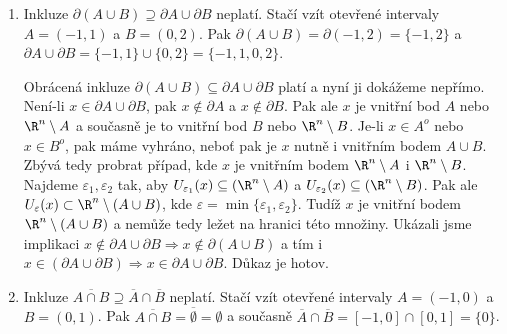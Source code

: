 \documentclass[answers]{exam}
\begin{document}
\begin{questions}
\begin{solution}
\begin{enumerate}[label=(\roman*)]
				Zkusme nyn\'i $\supseteq$. Je-li $x\in\partial\overline A$ a $\varepsilon>0$, pak $U_\varepsilon(x)\cap\overline A\ne\emptyset$ a $U_\varepsilon(x)\cap(\R^n\setminus\overline A)\ne\emptyset$. Jeliko\v z $(\R^n\setminus{\overline A})\subseteq (\R^n\setminus A)$, pak i $U_\varepsilon(x)\cap (\R^n\setminus A)\ne\emptyset$. Zvolme $x'\in U_\varepsilon(x)\cap\overline A$. Pak $U_\varepsilon(x)$ je otev\v ren\'e okol\'i $x'$ a jeliko\v z $x'\in\overline A$, pak $U_\varepsilon(x)$ mus\'i obsahovat bod z $A$. Tedy pro ka\v zd\'e $\varepsilon>0$ plat\'i $U_\varepsilon(x)\cap A\ne\emptyset$. Ka\v zd\'e otev\v ren\'e okol\'i bodu $x$ tedy protne $A$ i $\R^n\setminus A$. To ale z definice znamen\'a, \v ze $x\in\partial A$ a tedy i $x\in\overline{\partial A}$. Dok\'azali jsme $\overline{\partial A}\supseteq{\partial \overline A}$.
				
			\item 
				Inkluze $\partial (A\cup B)\supseteq\partial A\cup\partial B$ neplat\'i. Sta\v c\'i vz\'it otev\v ren\'e intervaly $A=(-1,1)$ a $B=(0,2)$. Pak $\partial({A\cup B})=\partial(-1,2)=\{-1,2\}$ a $\partial A\cup\partial B=\{-1,1\}\cup\{0,2\}=\{-1,1,0,2\}$.
				
				Obr\'acen\'a inkluze $\partial (A\cup B)\subseteq\partial A\cup\partial B$ plat\'i a nyn\'i ji dok\'a\v zeme nep\v r\'imo. Nen\'i-li $x\in\partial A\cup\partial B$, pak $x\not\in\partial A$ a $x\not\in\partial B$. Pak ale $x$ je vnit\v rn\'i bod $A$ nebo $\R^n\setminus A$ a sou\v casn\v e je to vnit\v rn\'i bod $B$ nebo $\R^n\setminus B$. Je-li $x\in A^o$ nebo $x\in B^o$, pak m\'ame vyhr\'ano, nebo\v t pak je $x$ nutn\v e i vnit\v rn\'im bodem $A\cup B$. Zb\'yv\'a tedy probrat p\v r\'ipad, kde $x$ je vnit\v rn\'im bodem $\R^n\setminus A$ i $\R^n\setminus B$. Najdeme $\varepsilon_1,\varepsilon_2$ tak, aby $U_{\varepsilon_1}(x)\subseteq(\R^n\setminus A) $ a $U_{\varepsilon_2}(x)\subseteq(\R^n\setminus B)$. Pak ale $U_\varepsilon(x)\subset \R^n\setminus(A\cup B)$, kde $\varepsilon=\min\{\varepsilon_1,\varepsilon_2\}$. Tud\'i\v z $x$ je vnit\v rn\'i bodem $\R^n\setminus(A\cup B)$ a nem\r u\v ze tedy le\v zet na hranici t\'eto mno\v ziny. Uk\'azali jsme implikaci $x\not\in\partial A\cup\partial B\Rightarrow x\not\in \partial (A\cup B)$ a t\'im i $x\in(\partial A\cup\partial B)\Rightarrow x\in\partial A\cup\partial B$. D\r ukaz je hotov.
				
			\item 
				Inkluze $\overline{A\cap B}\supseteq\overline A\cap\overline B$ neplat\'i. Sta\v c\'i vz\'it otev\v ren\'e intervaly $A=(-1,0)$ a $B=(0,1)$. Pak $\overline{A\cap B}=\overline\emptyset=\emptyset$ a sou\v casn\v e $\overline{A}\cap\overline B=[-1,0]\cap[0,1]=\{0\}$.
			

\end{enumerate}
\end{solution}
\end{questions}
\end{document}
